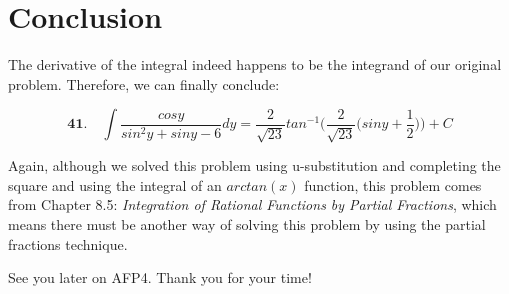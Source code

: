 \section*{Conclusion}

The derivative of the integral indeed happens to be the integrand
of our original problem. Therefore, we can finally conclude:

\begin{equation*}
	\textbf{41.}\quad \int \frac{cosy}{sin^2y+siny-6} dy =	
	\frac{2}{\sqrt{23}} tan^{-1}\bigg(
	\frac{2}{\sqrt{23}}\big(
	siny+\frac{1}{2}
	\big)
	\bigg) + C
\end{equation*}

Again, although we solved this problem
using u-substitution and completing the square
and using the integral of an $ arctan(x) $ function,
this problem comes from Chapter 8.5: 
\textit{Integration of Rational Functions
by Partial Fractions}, which means
there must be another way of solving this problem by
using the partial fractions technique. 

See you later on AFP4. Thank you for your time!